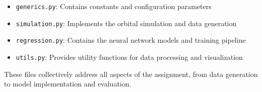 \documentclass[12pt,a4paper]{article}
\begin{document}
\begin{itemize}
    \item \texttt{generics.py}: Contains constants and configuration parameters
    \item \texttt{simulation.py}: Implements the orbital simulation and data generation
    \item \texttt{regression.py}: Contains the neural network models and training pipeline
    \item \texttt{utils.py}: Provides utility functions for data processing and visualization
\end{itemize}

These files collectively address all aspects of the assignment, from data generation to model implementation and evaluation.
\end{document}
